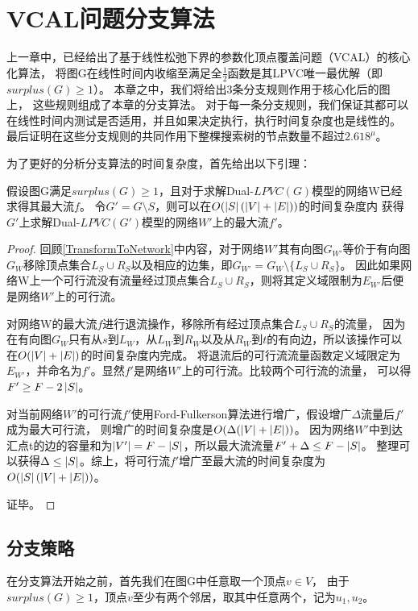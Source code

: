 \section{VCAL问题分支算法}
上一章中，已经给出了基于线性松弛下界的参数化顶点覆盖问题（VCAL）的核心化算法，
将图G在线性时间内收缩至满足全$\frac{1}{2}$函数是其LPVC唯一最优解（即$surplus(G) \ge 1$）。
本章之中，我们将给出3条分支规则作用于核心化后的图上，
这些规则组成了本章的分支算法。
对于每一条分支规则，我们保证其都可以在线性时间内测试是否适用，并且如果决定执行，执行时间复杂度也是线性的。
最后证明在这些分支规则的共同作用下整棵搜索树的节点数量不超过$2.618^\mu$。

\vspace{0.5cm}
为了更好的分析分支算法的时间复杂度，首先给出以下引理：
\begin{lemma} \label{LemmaUpdateMaxflow}
假设图G满足$surplus(G) \ge 1$，且对于求解Dual-$LPVC(G)$模型的网络W已经求得其最大流$f$。
令$G' = G \setminus S$，则可以在$O(\left\vert S \right\vert(\left\vert V \right\vert + \left\vert E \right\vert))$的时间复杂度内
获得$G'$上求解Dual-$LPVC(G')$模型的网络$W'$上的最大流$f'$。
\end{lemma}

\begin{proof}
回顾\ref{TransformToNetwork}中内容，对于网络$W'$其有向图$G_{W'}$等价于有向图$G_W$移除顶点集合$L_S \cup R_S$以及相应的边集，即$G_{W'} = G_W \setminus \{L_S \cup R_S\}$。
因此如果网络W上一个可行流没有流量经过顶点集合$L_S \cup R_S$，则将其定义域限制为$E_{W'}$后便是网络$W'$上的可行流。

对网络W的最大流$f$进行退流操作，移除所有经过顶点集合$L_S \cup R_S$的流量，
因为在有向图$G_W$只有从$s$到$L_W$，从$L_W$到$R_W$以及从$R_W$到$t$的有向边，所以该操作可以在$O(\left\vert V \right\vert + \left\vert E \right\vert)$的时间复杂度内完成。
将退流后的可行流流量函数定义域限定为$E_{W'}$，并命名为$f'$。显然$f'$是网络$W'$上的可行流。比较两个可行流的流量，
可以得$F' \ge F - 2 \left\vert S \right\vert$。

对当前网络$W'$的可行流$f'$使用Ford-Fulkerson算法进行增广，假设增广$\Delta$流量后$f'$成为最大可行流，
则增广的时间复杂度是$O(\Delta(\left\vert V \right\vert + \left\vert E \right\vert))$。
因为网络$W'$中到达汇点t的边的容量和为$\left\vert V' \right\vert = F - \left\vert S \right\vert$，所以最大流流量$F' + \Delta \le F - \left\vert S \right\vert$。
整理可以获得$\Delta \le \left\vert S \right\vert$。综上，将可行流$f'$增广至最大流的时间复杂度为$O(\left\vert S \right\vert(\left\vert V \right\vert + \left\vert E \right\vert))$。

证毕。
\end{proof}


\subsection{分支策略}
在分支算法开始之前，首先我们在图G中任意取一个顶点$v \in V$，
由于$surplus(G) \ge 1$，顶点$v$至少有两个邻居，取其中任意两个，记为$u_1, u_2$。


